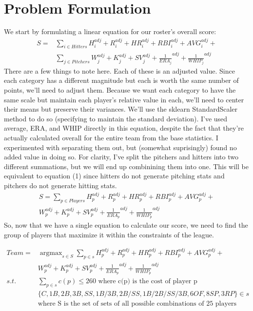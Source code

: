 \documentclass{article}
\DeclareMathOperator*{\argmax}{argmax}
\begin{document}
\section*{Problem Formulation}
We start by formulating a linear equation for our roster's overall score:
\begin{align}
S = &\sum\limits_{i \in Hitters} {H_i^{adj} + R_i^{adj} + HR_i^{adj} + RBI_i^{adj} + AVG_i^{adj}} + \nonumber \\ &\sum\limits_{j \in Pitchers} {W_j^{adj} + K_j^{adj} + SV_j^{adj} + {\frac{1}{ERA_j}}^{adj} + {\frac{1}{WHIP_j}}^{adj}}
\end{align} 
There are a few things to note here. Each of these is an adjusted value. Since each category has a different magnitude but each is worth the same number of points, we'll need to adjust them. Because we want each category to have the same scale but maintain each player's relative value in each, we'll need to center their means but preserve their variances. We'll use the sklearn StandardScaler method to do so (specifying to maintain the standard deviation). I've used average, ERA, and WHIP directly in this equation, despite the fact that they're actually calculated overall for the entire team from the base statistics. I experimented with separating them out, but (somewhat suprisingly) found no added value in doing so. For clarity, I've split the pitchers and hitters into two different summations, but we will end up combinining them into one. This will be equivalent to equation (1) since hitters do not generate pitching stats and pitchers do not generate hitting stats. 
\begin{align}
S = \sum\limits_{p \in Players} {H_p^{adj} + R_p^{adj} + HR_p^{adj} + RBI_p^{adj} + AVG_p^{adj}} + \\ \nonumber {W_p^{adj} + K_p^{adj} + SV_p^{adj} + {\frac{1}{ERA_p}}^{adj} + {\frac{1}{WHIP_p}}^{adj}}
\end{align} 
So, now that we have a single equation to calculate our score, we need to find the group of players that maximize it within the constraints of the league.

\begin{align}
Team = &\argmax_{s \in S} \sum\limits_{p \in s} {H_p^{adj} + R_p^{adj} + HR_p^{adj} + RBI_p^{adj} + AVG_p^{adj}} + \\ \nonumber &{W_p^{adj} + K_p^{adj} + SV_p^{adj} + {\frac{1}{ERA_p}}^{adj} + {\frac{1}{WHIP_p}}^{adj}} \\
\nonumber s.t. &\sum\limits_{p \in s} c(p) \leq 260 \mbox{ where c(p) is the cost of player p}\\
\nonumber &\{C,1B,2B,3B,SS,1B/3B,2B/SS,1B/2B/SS/3B,6 OF, 8 SP, 3 RP\} \in s \\ 
\nonumber &\mbox{where S is the set of sets of all possible combinations of 25 players}
\end{align}
\pagebreak
\end{document}
